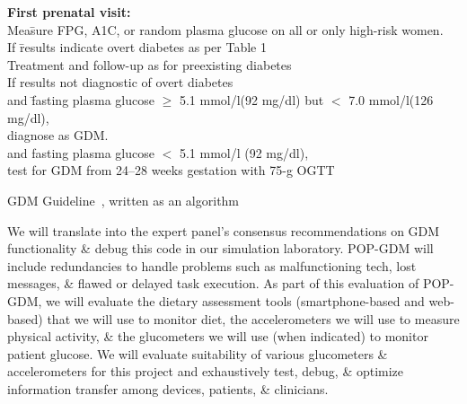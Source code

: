 \beginwfig{5.0in}
\vspace*{-.3in}
\begin{boxedminipage}{5.0in}
\vspace*{-.2in}
\parbox{5.0in}{\small
\begin{tabbing}
\textbf{First prenatal visit:}\\
Mea\=sure FPG, A1C, or random plasma glucose on all or only high-risk women. \\
  \> If \= results indicate overt diabetes as per Table 1\\
  \> \> Treatment and follow-up as for preexisting diabetes\\
  \> If results not diagnostic of overt diabetes\\
  \> \> and \= fasting plasma glucose $\geq$ 5.1 mmol/l(92 mg/dl) but $<$ 7.0 mmol/l(126 mg/dl), \\
  \> \> \> diagnose as GDM.\\
  \> \> and fasting plasma glucose $<$ 5.1 mmol/l (92 mg/dl),\\
  \>  \> \> test for GDM from 24--28 weeks gestation with 75-g OGTT
\end{tabbing}}\vspace*{-.3in}
\caption{GDM Guideline~\cite{Metzger2010}, written as an algorithm}\label{fig:gdm-alg}
\end{boxedminipage}
\vspace*{-.2in}
\endwfig

We will translate into \poppl{} the expert panel's consensus
recommendations on GDM functionality \& debug this code in our
simulation laboratory. POP-GDM will include redundancies to handle
problems such as malfunctioning tech, lost messages, \& flawed or
delayed task execution. As part of this evaluation of POP-GDM, we will
evaluate the dietary assessment tools (smartphone-based and web-based)
that we will use to monitor diet, the accelerometers we will use to
measure physical activity, \& the glucometers we will use (when
indicated) to monitor patient glucose. We will evaluate suitability of
various glucometers \& accelerometers for this project and
exhaustively test, debug, \& optimize information transfer among
devices, patients, \& clinicians.

